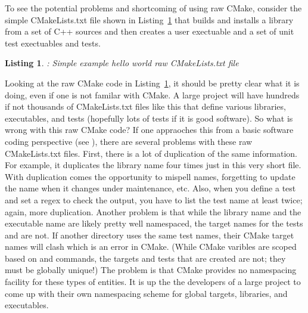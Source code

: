 \documentclass[note]{TechNote}
\newtheorem{listing}{Listing}
\begin{document}
To see the potential problems and shortcoming of using raw CMake, consider the simple CMakeLists.txt file shown in Listing~\ref{listing:RawHelloWorld} that builds and installs a library from a set of C++ sources and then creates a user exectuable and a set of unit test exectuables and tests.

\begin{listing}: Simple example hello world raw CMakeLists.txt file
\label{listing:RawHelloWorld}
{\small

}
\end{listing}

Looking at the raw CMake code in Listing~\ref{listing:RawHelloWorld}, it should be pretty clear what it is doing, even if one is not familar with CMake.  A large project will have hundreds if not thousands of CMakeLists.txt files like this that define various libraries, executables, and tests (hopefully lots of tests if it is good software).  So what is wrong with this raw CMake code?  If one appraoches this from a basic software coding perspective (see \cite{CodeComplete2nd04}), there are several problems with these raw CMakeLists.txt files.  First, there is a lot of duplication of the same information.  For example, it duplicates the library name  four times just in this very short file.  With duplication comes the opportunity to mispell names, forgetting to update the name when it changes under maintenance, etc.  Also, when you define a test and set a regex to check the output, you have to list the test name at least twice; again, more duplication.  Another problem is that while the library name  and the executable name  are likely pretty well namespaced, the target names for the tests  and  are not.  If another directory uses the same test names, their CMake target names will clash which is an error in CMake.  (While CMake varibles are scoped based on  and  commands, the targets and tests that are created are not; they must be globally unique!)  The problem is that CMake provides no namespacing facility for these types of entities.  It is up the the developers of a large project to come up with their own namespacing scheme for global targets, libraries, and executables.
\end{document}
